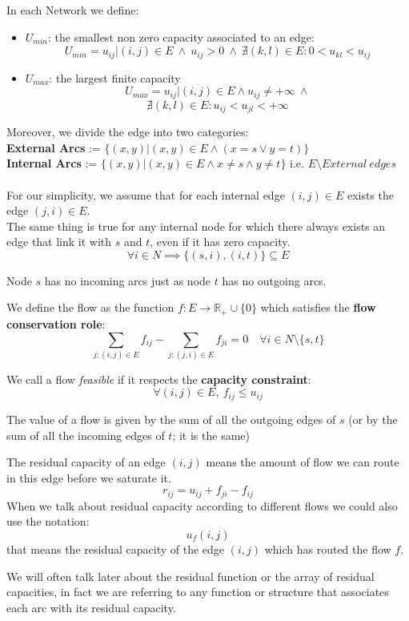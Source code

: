 \begin{definition}
    In each Network we define:
    \begin{itemize}
        \item $U_{min}$: the smallest non zero capacity associated to an edge:
        \[U_{min} = u_{ij} | (i,j) \in E\ \land\ u_{ij} > 0\ \land\ \nexists (k,l) \in E : 0<u_{kl}<u_{ij}\]
        \item $U_{max}$: the largest finite capacity
        \[U_{max} = u_{ij}| (i,j) \in E\land u_{ij} \not = + \infty\ \land \]
        \[\nexists (k,l) \in E : u_{ij}< u_{jl} < +\infty \]
    \end{itemize}
\end{definition}
Moreover, we divide the edge into two categories:\\
\textbf{External Arcs} := $\{(x,y) | (x,y)\in E \land (x = s \lor y = t)\}$\\
\textbf{Internal Arcs} := $\{(x,y) | (x,y)\in E \land x \not = s \land y \not = t\}$ i.e. $E \setminus External\ edges$\\
\\
For our simplicity, we assume that for each internal edge $(i,j)\in E$ exists the edge $(j,i) \in E$.\\ The same thing is true for any internal node for which there always exists an edge that link it with $s$ and $t$, even if it has zero capacity.
\[\forall i \in N \implies \{(s,i),(i,t)\} \subseteq E\]
\begin{obs}
    Node $s$ has no incoming arcs just as node $t$ has no outgoing arcs.
\end{obs}

\begin{definition}[Flow]
    We define the flow as the function $f: E \rightarrow\mathbb{R}_+ \cup \{0\}$ which satisfies the \textbf{flow conservation role}:
    \[\sum_{j:(i,j) \in E} f_{ij} - \sum_{j:(j,i) \in E}f_{ji} = 0 \quad \forall i \in N\setminus\{s,t\}\]
\end{definition}

We call a flow \textit{feasible} if it respects the \textbf{capacity constraint}: \[\forall (i,j) \in E,\ f_{ij} \le u_{ij}\]

The value of a flow is given by the sum of all the outgoing edges of $s$ (or by the sum of all the incoming edges of $t$; it is the same)
\begin{definition}
    The residual capacity of an edge $(i,j)$ means the amount of flow we can route in this edge before we saturate it.
    \[r_{ij} = u_{ij} + f_{ji} - f_{ij}\]    
    When we talk about residual capacity according to different flows we could also use the notation:    \[u_f(i,j)\]
    that means the residual capacity of the edge $(i,j)$ which has routed the flow $f$.

\end{definition}
We will often talk later about the residual function or the array of residual capacities, in fact we are referring to any function or structure that associates each arc with its residual capacity.

